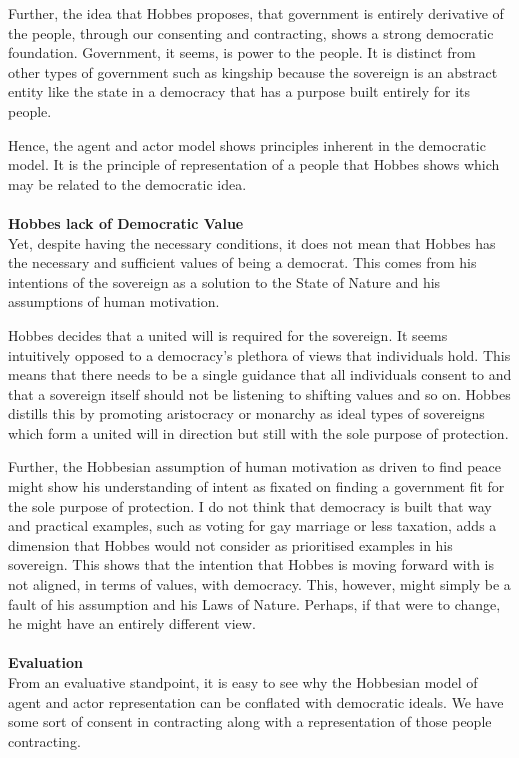 \documentclass[12pt, letterpaper]{article}
\begin{document}
Further, the idea that Hobbes proposes, that government is entirely derivative of the people, through our consenting and contracting, shows a strong democratic foundation. Government, it seems, is power to the people. It is distinct from other types of government such as kingship because the sovereign is an abstract entity like the state in a democracy that has a purpose built entirely for its people.

Hence, the agent and actor model shows principles inherent in the democratic model. It is the principle of representation of a people that Hobbes shows which may be related to the democratic idea.\\\\
\textbf{Hobbes lack of Democratic Value}\\
Yet, despite having the necessary conditions, it does not mean that Hobbes has the necessary and sufficient values of being a democrat. This comes from his intentions of the sovereign as a solution to the State of Nature and his assumptions of human motivation.

Hobbes decides that a united will is required for the sovereign. It seems intuitively opposed to a democracy's plethora of views that individuals hold. This means that there needs to be a single guidance that all individuals consent to and that a sovereign itself should not be listening to shifting values and so on. Hobbes distills this by promoting aristocracy or monarchy as ideal types of sovereigns which form a united will in direction but still with the sole purpose of protection.

Further, the Hobbesian assumption of human motivation as driven to find peace might show his understanding of intent as fixated on finding a government fit for the sole purpose of protection. I do not think that democracy is built that way and practical examples, such as voting for gay marriage or less taxation, adds a dimension that Hobbes would not consider as prioritised examples in his sovereign. This shows that the intention that Hobbes is moving forward with is not aligned, in terms of values, with democracy. This, however, might simply be a fault of his assumption and his Laws of Nature. Perhaps, if that were to change, he might have an entirely different view.\\\\
\textbf{Evaluation}\\
From an evaluative standpoint, it is easy to see why the Hobbesian model of agent and actor representation can be conflated with democratic ideals. We have some sort of consent in contracting along with a representation of those people contracting.
\end{document}
